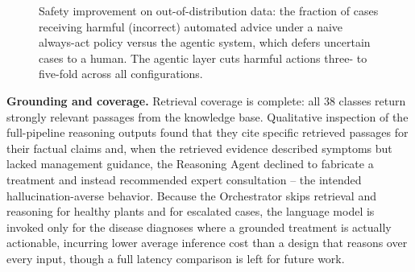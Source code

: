 \documentclass[conference]{IEEEtran}
\begin{document}
\begin{figure}[t]
\centering
{}
\caption{Safety improvement on out-of-distribution data: the fraction of cases receiving harmful (incorrect) automated advice under a naive always-act policy versus the agentic system, which defers uncertain cases to a human. The agentic layer cuts harmful actions three- to five-fold across all configurations.}
\label{fig:safety}
\end{figure}

\textbf{Grounding and coverage.} Retrieval coverage is complete: all 38 classes return strongly relevant passages from the knowledge base. Qualitative inspection of the full-pipeline reasoning outputs found that they cite specific retrieved passages for their factual claims and, when the retrieved evidence described symptoms but lacked management guidance, the Reasoning Agent declined to fabricate a treatment and instead recommended expert consultation -- the intended hallucination-averse behavior. Because the Orchestrator skips retrieval and reasoning for healthy plants and for escalated cases, the language model is invoked only for the disease diagnoses where a grounded treatment is actually actionable, incurring lower average inference cost than a design that reasons over every input, though a full latency comparison is left for future work.
\end{document}

